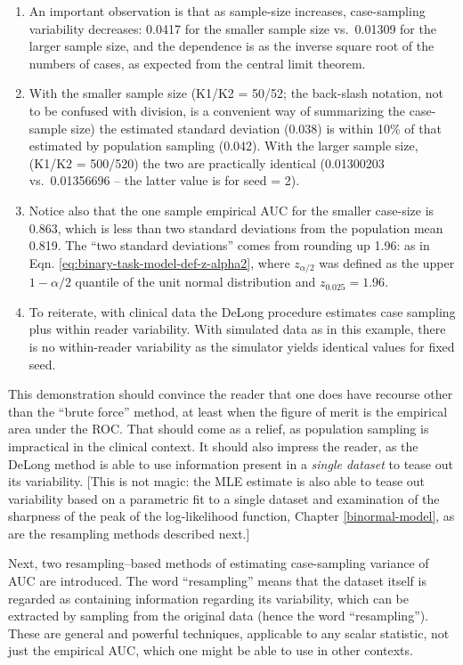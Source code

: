\documentclass[
]{book}
\providecommand{\tightlist}{%
  \setlength{\itemsep}{0pt}\setlength{\parskip}{0pt}}
\begin{document}
\begin{enumerate}
\def\labelenumi{\arabic{enumi}.}
\tightlist
\item
  An important observation is that as sample-size increases, case-sampling variability decreases: 0.0417 for the smaller sample size vs.~0.01309 for the larger sample size, and the dependence is as the inverse square root of the numbers of cases, as expected from the central limit theorem.
\item
  With the smaller sample size (K1/K2 = 50/52; the back-slash notation, not to be confused with division, is a convenient way of summarizing the case-sample size) the estimated standard deviation (0.038) is within 10\% of that estimated by population sampling (0.042). With the larger sample size, (K1/K2 = 500/520) the two are practically identical (0.01300203 vs.~0.01356696 -- the latter value is for seed = 2).
\item
  Notice also that the one sample empirical AUC for the smaller case-size is 0.863, which is less than two standard deviations from the population mean 0.819. The ``two standard deviations'' comes from rounding up 1.96: as in Eqn. \eqref{eq:binary-task-model-def-z-alpha2}, where \(z_{\alpha/2}\) was defined as the upper \(1-\alpha/2\) quantile of the unit normal distribution and \(z_{0.025}=1.96\).
\item
  To reiterate, with clinical data the DeLong procedure estimates case sampling plus within reader variability. With simulated data as in this example, there is no within-reader variability as the simulator yields identical values for fixed seed.
\end{enumerate}

This demonstration should convince the reader that one does have recourse other than the ``brute force'' method, at least when the figure of merit is the empirical area under the ROC. That should come as a relief, as population sampling is impractical in the clinical context. It should also impress the reader, as the DeLong method is able to use information present in a \emph{single dataset} to tease out its variability. {[}This is not magic: the MLE estimate is also able to tease out variability based on a parametric fit to a single dataset and examination of the sharpness of the peak of the log-likelihood function, Chapter \ref{binormal-model}, as are the resampling methods described next.{]}

Next, two resampling--based methods of estimating case-sampling variance of AUC are introduced. The word ``resampling'' means that the dataset itself is regarded as containing information regarding its variability, which can be extracted by sampling from the original data (hence the word ``resampling''). These are general and powerful techniques, applicable to any scalar statistic, not just the empirical AUC, which one might be able to use in other contexts.
\end{document}
